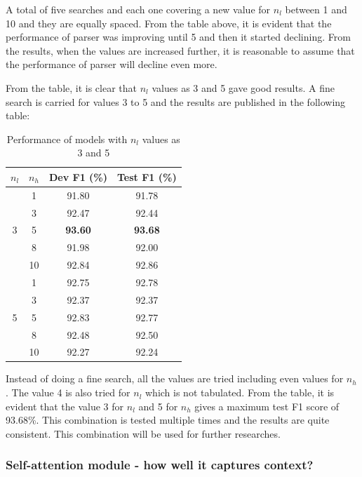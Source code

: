 \documentclass[a4paper, 11pt]{article}
\begin{document}
A total of five searches and each one covering a new value for $n_l$ between 1 and 10 and they are equally spaced. From the table above, it is evident that the performance of parser was improving until 5 and then it started declining. From the results, when the values are increased further, it is reasonable to assume that the performance of parser will decline even more. 

From the table, it is clear that $n_l$ values as 3 and 5 gave good results. A fine search is carried for values 3 to 5 and the results are published in the following table:

\begin{table}[h!]
  \begin{center}
  \def\arraystretch{1.5}%

    \label{tab:fine_search_for_layers_heads}
    \begin{tabular}{c|c|c|c}
      \textbf{$n_l$} & \textbf{$n_h$} & Dev F1 (\%) & Test F1 (\%) \\
      \hline
      \multirow{5}{*}{3} & 1 & 91.80 & 91.78\\
	  & 3 & 92.47 & 92.44\\
	  & 5 & \textbf{93.60} & \textbf{93.68}\\
	  & 8 & 91.98 & 92.00\\
	  & 10 & 92.84 & 92.86\\
	  \hline
      \multirow{5}{*}{5} & 1 & 92.75 & 92.78\\
	  & 3 & 92.37 & 92.37\\
	  & 5 & 92.83 & 92.77\\
	  & 8 & 92.48 & 92.50\\
	  & 10 & 92.27 & 92.24\\
    \end{tabular}
    \caption{Performance of models with $n_l$ values as 3 and 5}
  \end{center}
\end{table}

Instead of doing a fine search, all the values are tried including even values for $n_h$. The value 4 is also tried for $n_l$ which is not tabulated. From the table, it is evident that the value 3 for $n_l$ and 5 for $n_h$ gives a maximum test F1 score of 93.68\%. This combination is tested multiple times and the results are quite consistent. This combination will be used for further researches. 

\subsubsection{Self-attention module - how well it captures context? }
\end{document}
